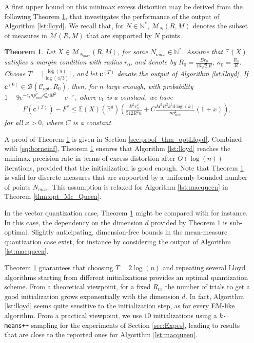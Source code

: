 \documentclass[noinfoline,preprint]{article}
\newtheorem{theorem}{Theorem}
\newcommand{\cb}{\mathbf{c}}
\newcommand{\R}{\mathbb{R}}
\newcommand{\E}{\mathbb{E}}
\renewcommand{\1}{\mathds 1}
\newcommand{\B}{\mathcal{B}}
\begin{document}
A first upper bound on this minimax excess distortion may be derived from the following Theorem \ref{thm:optLloyd}, that investigates the performance of the output of Algorithm \ref{lst:lloyd}. We recall that, for $N \in \mathbb{N}^*$, $\mathcal{M}_N(R,M)$ denotes the subset of measures in $\mathcal{M}(R,M)$ that are supported by $N$ points.
\begin{theorem}\label{thm:optLloyd}
Let $X \in \mathcal{M}_{N_{max}}(R,M)$, for some $N_{max} \in \mathbb{N}^*$. Assume that $\mathbb{E}(X)$ satisfies a margin condition with radius $r_0$, and denote by $R_0= \frac{Br_0}{16\sqrt{2}R}$, $\kappa_0 = \frac{R_0}{R}$. Choose $T = \lceil \frac{\log(n)}{\log(4/3)} \rceil$, and let $\cb^{(T)}$ denote the output of Algorithm \ref{lst:lloyd}. If $\cb^{(0)} \in \B(\mathcal{C}_{opt},R_0)$, then, for $n$ large enough, with probability $1-9e^{-c_1 n p_{min}^2 \kappa_0^2/M^2 } - e^{-x}$, where $c_1$ is a constant, we have
\begin{align*}
F(\cb^{(T)}) - F^* \leq \E(X)(\R^d) \left (\frac{ B^2r_0^2}{512 R^2 n} + C \frac{M^2 R^2 k^2d \log(k)}{n p_{min}^2}(1+x) \right ),
\end{align*}
for all $x>0$, where $C$ is a constant.
\end{theorem}
A proof of Theorem \ref{thm:optLloyd} is given in Section \ref{sec:proof_thm_optLloyd}. Combined with \eqref{eq:borneinf}, Theorem \ref{thm:optLloyd} ensures that Algorithm \ref{lst:lloyd} reaches the minimax precision rate in terms of excess distortion after $O(\log(n))$ iterations, provided that the initialization is good enough. Note that Theorem \ref{thm:optLloyd} is valid for discrete measures that are supported by a uniformly bounded number of points $N_{max}$. This assumption is relaxed for Algorithm \ref{lst:macqueen} in Theorem \ref{thm:opt_Mc_Queen}.

In the vector quantization case, Theorem \ref{thm:optLloyd} might be compared with \cite[Theorem 3.1]{Levrard15} for instance. In this case, the dependency on the dimension $d$ provided by Theorem \ref{thm:optLloyd} is sub-optimal. Slightly anticipating, dimension-free bounds in the mean-measure quantization case exist, for instance by considering the output of Algorithm \ref{lst:macqueen}.

Theorem \ref{thm:optLloyd} guarantees that choosing $T=2 \log(n)$ and repeating several Lloyd algorithms starting from different initializations provides an optimal quantization scheme. From a theoretical viewpoint, for a fixed $R_0$, the number of trials to get a good initialization grows exponentially with the dimension $d$. In fact, Algorithm \ref{lst:lloyd} seems quite sensitive to the initialization step, as for every EM-like algorithm. From a practical viewpoint, we use $10$ initializations using a \texttt{$k$-means++} sampling \cite{Arthur07} for the experiments of Section \ref{sec:Expes}, leading to results that are close to the reported ones for Algorithm \ref{lst:macqueen}. 
\end{document}

